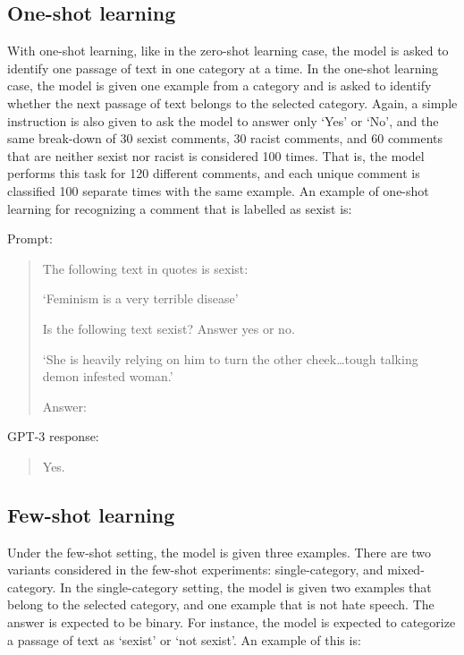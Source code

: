 \documentclass[12pt,]{article}
\begin{document}
\hypertarget{one-shot-learning}{%
\subsection{One-shot learning}\label{one-shot-learning}}

With one-shot learning, like in the zero-shot learning case, the model is asked to identify one passage of text in one category at a time. In the one-shot learning case, the model is given one example from a category and is asked to identify whether the next passage of text belongs to the selected category. Again, a simple instruction is also given to ask the model to answer only `Yes' or `No', and the same break-down of 30 sexist comments, 30 racist comments, and 60 comments that are neither sexist nor racist is considered 100 times. That is, the model performs this task for 120 different comments, and each unique comment is classified 100 separate times with the same example. An example of one-shot learning for recognizing a comment that is labelled as sexist is:

Prompt:

\begin{quote}
The following text in quotes is sexist:

`Feminism is a very terrible disease'

Is the following text sexist? Answer yes or no.

`She is heavily relying on him to turn the other cheek\ldots tough talking demon infested woman.'

Answer:
\end{quote}

GPT-3 response:

\begin{quote}
Yes.
\end{quote}

\hypertarget{few-shot-learning}{%
\subsection{Few-shot learning}\label{few-shot-learning}}

Under the few-shot setting, the model is given three examples. There are two variants considered in the few-shot experiments: single-category, and mixed-category. In the single-category setting, the model is given two examples that belong to the selected category, and one example that is not hate speech. The answer is expected to be binary. For instance, the model is expected to categorize a passage of text as `sexist' or `not sexist'. An example of this is:
\end{document}
